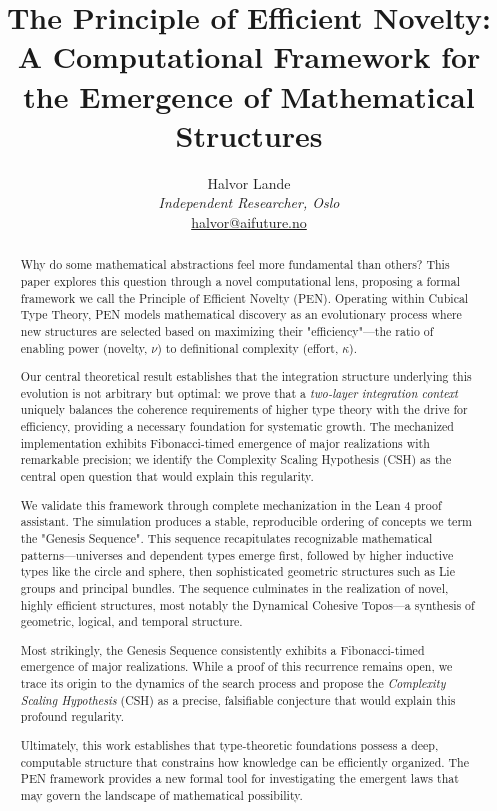 \documentclass[11pt]{article}
\title{The Principle of Efficient Novelty: A Computational Framework for the Emergence of Mathematical Structures}
\author{
Halvor Lande\\
\textit{Independent Researcher, Oslo}\\
\href{mailto:halvor@aifuture.no}{halvor@aifuture.no}
}
\theoremstyle{definition}
\theoremstyle{plain}
\theoremstyle{remark}
\begin{document}
\maketitle
\begin{abstract}
Why do some mathematical abstractions feel more fundamental than others? This paper explores this question through a novel computational lens, proposing a formal framework we call the Principle of Efficient Novelty (PEN). Operating within Cubical Type Theory, PEN models mathematical discovery as an evolutionary process where new structures are selected based on maximizing their "efficiency"—the ratio of enabling power (novelty, $\nu$) to definitional complexity (effort, $\kappa$).

Our central theoretical result establishes that the integration structure underlying this evolution is not arbitrary but optimal: we prove that a \emph{two-layer integration context} uniquely balances the coherence requirements of higher type theory with the drive for efficiency, providing a necessary foundation for systematic growth. The mechanized implementation exhibits Fibonacci-timed emergence of major realizations with remarkable precision; we identify the Complexity Scaling Hypothesis (CSH) as the central open question that would explain this regularity.

We validate this framework through complete mechanization in the Lean 4 proof assistant. The simulation produces a stable, reproducible ordering of concepts we term the "Genesis Sequence". This sequence recapitulates recognizable mathematical patterns—universes and dependent types emerge first, followed by higher inductive types like the circle and sphere, then sophisticated geometric structures such as Lie groups and principal bundles. The sequence culminates in the realization of novel, highly efficient structures, most notably the Dynamical Cohesive Topos—a synthesis of geometric, logical, and temporal structure.

Most strikingly, the Genesis Sequence consistently exhibits a Fibonacci-timed emergence of major realizations. While a proof of this recurrence remains open, we trace its origin to the dynamics of the search process and propose the \emph{Complexity Scaling Hypothesis} (CSH) as a precise, falsifiable conjecture that would explain this profound regularity.

Ultimately, this work establishes that type-theoretic foundations possess a deep, computable structure that constrains how knowledge can be efficiently organized. The PEN framework provides a new formal tool for investigating the emergent laws that may govern the landscape of mathematical possibility.
\end{abstract}
\end{document}
